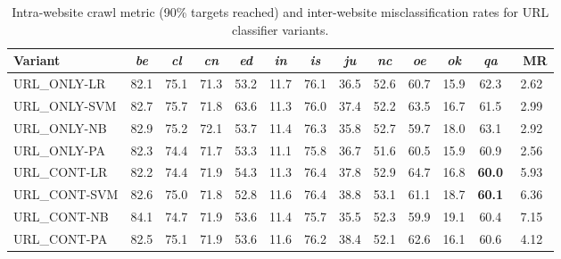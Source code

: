 \begin{table}
	\centering
	\caption{Intra-website crawl metric (90\% targets reached) and inter-website misclassification rates for URL classifier variants.}
	\begin{tabular}{lcccccccccccc}
		\toprule
		\textbf{Variant} & \emph{be} & \emph{cl} & \emph{cn} & \emph{ed} & \emph{in} & \emph{is} & \emph{ju} & \emph{nc} & \emph{oe} & \emph{ok} & \emph{qa} & \bfseries MR \\
		\midrule
		\small URL\_ONLY-LR & 82.1 & 75.1 & 71.3 & 53.2 & 11.7 & 76.1 & 36.5 & 52.6 & 60.7 & 15.9 & 62.3 & 2.62 \\
		\small URL\_ONLY-SVM & 82.7 & 75.7 & 71.8 & 63.6 & 11.3 & 76.0 & 37.4 & 52.2 & 63.5 & 16.7 & 61.5 & 2.99 \\
		\small URL\_ONLY-NB & 82.9 & 75.2 & 72.1 & 53.7 & 11.4 & 76.3 & 35.8 & 52.7 & 59.7 & 18.0 & 63.1 & 2.92 \\
		\small URL\_ONLY-PA & 82.3 & 74.4 & 71.7 & 53.3 & 11.1 & 75.8 & 36.7 & 51.6 & 60.5 & 15.9 & 60.9 & 2.56 \\
		\small URL\_CONT-LR & 82.2 & 74.4 & 71.9 & 54.3 & 11.3 & 76.4 & 37.8 & 52.9 & 64.7 & 16.8 & \textbf{60.0} & 5.93 \\
		\small URL\_CONT-SVM & 82.6 & 75.0 & 71.8 & 52.8 & 11.6 & 76.4 & 38.8 & 53.1 & 61.1 & 18.7 & \textbf{60.1} & 6.36 \\
		\small URL\_CONT-NB & 84.1 & 74.7 & 71.9 & 53.6 & 11.4 & 75.7 & 35.5 & 52.3 & 59.9 & 19.1 & 60.4 & 7.15 \\
		\small URL\_CONT-PA & 82.5 & 75.1 & 71.9 & 53.6 & 11.6 & 76.2 & 38.4 & 52.1 & 62.6 & 16.1 & 60.6 & 4.12 \\
		\bottomrule
	\end{tabular}
	\label{tab:expes_url_classifier}
\end{table}


